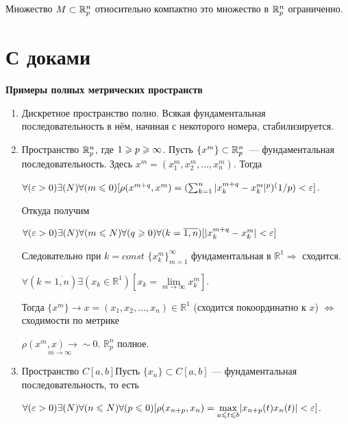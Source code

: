 Множество $M \subset \mathbb{R}^n_p$ относительно компактно \tttk это множество в $\mathbb{R}^n_p$
ограниченно.


\section*{С  доками}
    
\textbf{Примеры полных метрических пространств  }

\begin{enumerate}
    \item Дискретное пространство полно. Всякая фундаментальная последовательность
          в нём, начиная с некоторого номера, стабилизируется.
    \item Пространство $\mathbb{R}^n_p$, где $1\geqslant p \geqslant \infty $. Пусть $\{x^m\}\subset\mathbb{R}^n_p$~---
          фундаментальная последовательность. Здесь $x^m=(x^m_1, x^m_2, \dots, x^m_n)$.
          Тогда

          $\forall(\varepsilon>0)\exists(N)\forall(m\leqslant 0)[\rho(x^{m+q},x^m)=
              (\sum_{k = 1}^{n}|x^{m+q}_k-x^m_k|^p)^(1/p)<\varepsilon]$.

          Откуда получим

          $\forall(\varepsilon>0)\exists(N)\forall(m\leqslant  N)\forall(q\geqslant 0)\forall(k=
              \overline{1,n})[|x^{m+q}_k-x^m_k|<\varepsilon]$

          Следовательно при $k=const$ $\{x^m_k\}^\infty _{m=1}$ фундаментальная
          в $\mathbb{R}^1\Longrightarrow$  сходится.

          $\forall(k=\overline{1,n})\exists(x_k\in\mathbb{R}^1)[x_k=\underset{m \to
                      \infty }{\lim} x^m_k]$.

          Тогда $\{x^m \} \longrightarrow x=(x_1,x_2,\dots,x_n)\in\mathbb{R}^1$
          (сходится покоординатно к $x$) $\Longleftrightarrow $ сходимости по метрике

          $\underset{m\rightarrow\infty }{\rho(x^m,x)\rightarrow\sim0}$. $\mathbb{R}^n_p$ полное.

    \item Пространство $C[a, b]$Пусть $\{x_n\} \subset C[a, b]$ — фундаментальная
          последовательность, то есть

          $\forall (\varepsilon > 0)\exists (N)\forall (n \leqslant  N )\forall (p \leqslant  0)[\rho(x_{n+p}, x_n) =  \underset{a\leqslant  t \leqslant  b}{\max}|x_{n+p}(t) x_n(t)|
              <\varepsilon]$.


\end{enumerate}
